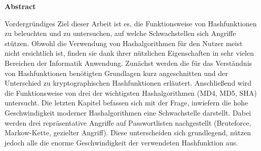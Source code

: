 \documentclass[12pt,a4paper]{scrartcl}
\numberwithin{equation}{section}
\numberwithin{myalgctr}{section}
\numberwithin{mytheoremctr}{section}
\begin{document}
	
	
	\newpage\noindent
	{\huge \bfseries Abstract}
		\newline
	\par\noindent
	Vordergründiges Ziel dieser Arbeit ist es, die Funktionsweise von Hashfunktionen zu beleuchten und zu untersuchen, auf welche Schwachstellen sich Angriffe stützen. Obwohl die Verwendung von Hashalgorithmen für den Nutzer meist nicht ersichtlich ist, finden sie dank ihrer nützlichen Eigenschaften in sehr vielen Bereichen der Informatik Anwendung. Zunächst werden die für das Verständnis von Hashfunktionen benötigten Grundlagen kurz angeschnitten und der Unterschied zu kryptographischen Hashfunktionen erläutert. %
	Anschließend wird die Funktionsweise von drei der wichtigsten Hashalgorithmen (MD4, MD5, SHA) untersucht.
	Die letzten Kapitel befassen sich mit der Frage, inwiefern die hohe Geschwindigkeit moderner Hashalgorithmen eine Schwachstelle darstellt. Dabei werden drei repräsentative Angriffe auf Passwortlisten nachgestellt (Bruteforce, Markow-Kette, gezielter Angriff). Diese unterscheiden sich grundlegend, nützen jedoch alle die enorme Geschwindigkeit der verwendeten Hashfunktion aus.
	
	\thispagestyle{firststyle}

	\newpage
	\tableofcontents
	\thispagestyle{firststyle}
	
	\newpage
\end{document}
